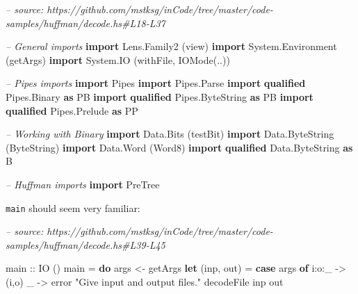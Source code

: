 \documentclass[]{article}
\newenvironment{Shaded}{}{}
\newcommand{\CommentTok}[1]{\textcolor[rgb]{0.38,0.63,0.69}{\textit{#1}}}
\newcommand{\DataTypeTok}[1]{\textcolor[rgb]{0.56,0.13,0.00}{#1}}
\newcommand{\FunctionTok}[1]{\textcolor[rgb]{0.02,0.16,0.49}{#1}}
\newcommand{\KeywordTok}[1]{\textcolor[rgb]{0.00,0.44,0.13}{\textbf{#1}}}
\newcommand{\NormalTok}[1]{#1}
\newcommand{\OtherTok}[1]{\textcolor[rgb]{0.00,0.44,0.13}{#1}}
\newcommand{\StringTok}[1]{\textcolor[rgb]{0.25,0.44,0.63}{#1}}
\begin{document}
\begin{Shaded}
\begin{Highlighting}[]
\CommentTok{-- source: https://github.com/mstksg/inCode/tree/master/code-samples/huffman/decode.hs#L18-L37}

\CommentTok{-- General imports}
\KeywordTok{import} \DataTypeTok{Lens.Family2}\NormalTok{       (view)}
\KeywordTok{import} \DataTypeTok{System.Environment}\NormalTok{ (getArgs)}
\KeywordTok{import} \DataTypeTok{System.IO}\NormalTok{          (withFile, }\DataTypeTok{IOMode}\NormalTok{(..))}

\CommentTok{-- Pipes imports}
\KeywordTok{import} \DataTypeTok{Pipes}
\KeywordTok{import} \DataTypeTok{Pipes.Parse}
\KeywordTok{import} \KeywordTok{qualified} \DataTypeTok{Pipes.Binary}     \KeywordTok{as} \DataTypeTok{PB}
\KeywordTok{import} \KeywordTok{qualified} \DataTypeTok{Pipes.ByteString} \KeywordTok{as} \DataTypeTok{PB}
\KeywordTok{import} \KeywordTok{qualified} \DataTypeTok{Pipes.Prelude}    \KeywordTok{as} \DataTypeTok{PP}

\CommentTok{-- Working with Binary}
\KeywordTok{import} \DataTypeTok{Data.Bits}\NormalTok{                 (testBit)}
\KeywordTok{import} \DataTypeTok{Data.ByteString}\NormalTok{           (}\DataTypeTok{ByteString}\NormalTok{)}
\KeywordTok{import} \DataTypeTok{Data.Word}\NormalTok{                 (}\DataTypeTok{Word8}\NormalTok{)}
\KeywordTok{import} \KeywordTok{qualified} \DataTypeTok{Data.ByteString} \KeywordTok{as} \DataTypeTok{B}

\CommentTok{-- Huffman imports}
\KeywordTok{import} \DataTypeTok{PreTree}
\end{Highlighting}
\end{Shaded}

\texttt{main} should seem very familiar:

\begin{Shaded}
\begin{Highlighting}[]
\CommentTok{-- source: https://github.com/mstksg/inCode/tree/master/code-samples/huffman/decode.hs#L39-L45}

\OtherTok{main ::} \DataTypeTok{IO}\NormalTok{ ()}
\NormalTok{main }\FunctionTok{=} \KeywordTok{do}
\NormalTok{    args     }\OtherTok{<-}\NormalTok{ getArgs}
    \KeywordTok{let}\NormalTok{ (inp, out)  }\FunctionTok{=} \KeywordTok{case}\NormalTok{ args }\KeywordTok{of}
\NormalTok{                        i}\FunctionTok{:}\NormalTok{o}\FunctionTok{:}\NormalTok{_      }\OtherTok{->}\NormalTok{ (i,o)}
\NormalTok{                        _          }\OtherTok{->}\NormalTok{ error }\StringTok{"Give input and output files."}
\NormalTok{    decodeFile inp out}
\end{Highlighting}
\end{Shaded}
\end{document}
